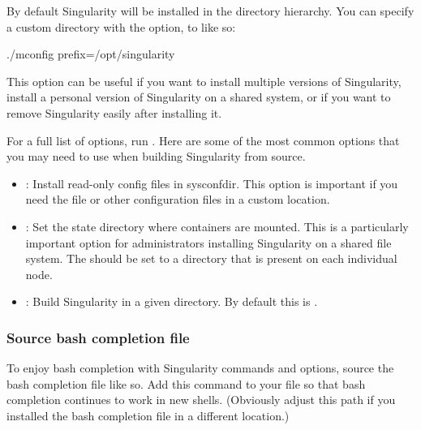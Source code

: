 \documentclass[letterpaper,10pt,english]{sphinxmanual}
\begin{document}
By default Singularity will be installed in the  directory hierarchy.
You can specify a custom directory with the  option, to 
like so:

%
\begin{sphinxVerbatim}[commandchars=\\\{\}]
\PYGZdl{} ./mconfig \PYGZhy{}\PYGZhy{}prefix=/opt/singularity
\end{sphinxVerbatim}

This option can be useful if you want to install multiple versions of
Singularity, install a personal version of Singularity on a shared system, or if
you want to remove Singularity easily after installing it.

For a full list of  options, run .  Here are some
of the most common options that you may need to use when building Singularity
from source.
\begin{itemize}
\item {} 
: Install read-only config files in sysconfdir.  This option is important if you need the  file or other configuration files in a custom location.

\item {} 
: Set the state directory where containers are mounted. This is a particularly important option for administrators installing Singularity on a shared file system.  The  should be set to a directory that is present on each individual node.

\item {} 
: Build Singularity in a given directory. By default this is .

\end{itemize}


\subsubsection{Source bash completion file}
\label{\detokenize{installation:source-bash-completion-file}}
To enjoy bash completion with Singularity commands and options, source the bash
completion file like so. Add this command to your  file so that bash
completion continues to work in new shells.  (Obviously adjust this path if you
installed the bash completion file in a different location.)
\end{document}
